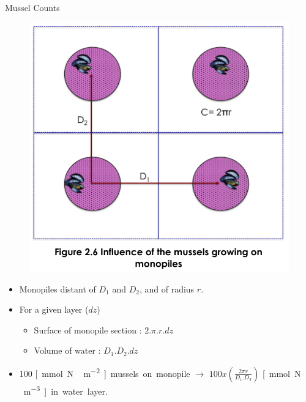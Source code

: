 \documentclass[final,xcolor=dvipsnames]{beamer}
\begin{document}
      \begin{frame}
	\begin{exampleblock}{Mussel Counts} %
	  \begin{figure}
	    \includegraphics[width=.3\framewidth]{HorizontalL}
	  \end{figure}
	  \begin{itemize}
	    \item Monopiles distant of $D_1$ and $D_2$, and of radius $r$. 
	    \item For a given layer ($dz$)
	    \begin{itemize}
	      \item Surface of monopile section : $2.\pi.r.dz$
	      \item Volume of water : $D_1.D_2.dz$
	    \end{itemize}
	    \item 100 \unit[mmol N\,m^{-2}] mussels on monopile $\rightarrow$ $100 x \left(\frac{2\pi r}{D_1.D_2}\right)$ \unit[mmol N\,m^{-3}] in water layer.
	  \end{itemize}
	\end{exampleblock}
      \end{frame}
      
\end{document}
